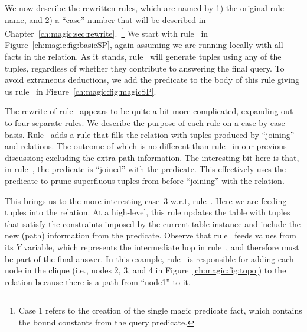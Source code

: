 We now describe the rewritten rules, which are named by 1) the original rule
name, and 2) a ``case'' number that will be described in
Chapter~\ref{ch:magic:sec:rewrite}.~\footnote{Case 1 refers to the creation of
the single magic predicate  fact, which contains the bound
constants from the query predicate.} We start with rule~ in
Figure~\ref{ch:magic:fig:basicSP}, again assuming we are running locally with
all facts in the  relation.  As it stands, rule~ will generate
 tuples using any of the  tuples, regardless of whether they
contribute to answering the final query.  To avoid extraneous deductions, we
add the  predicate to the body of this rule giving us
rule~ in Figure~\ref{ch:magic:fig:magicSP}.

The rewrite of rule~ appears to be quite a bit more complicated,
expanding out to four separate rules.  We describe the purpose of each rule on
a case-by-case basis.  Rule~ adds a rule that fills the
 relation with tuples produced by ``joining'' 
and  relations.  The outcome of which is no different than
rule~ in our previous discussion; excluding the extra path
information.  The interesting bit here is that, in rule~, the
 predicate is ``joined'' with the  predicate.  This
effectively uses the  predicate to prune superfluous tuples
from  before ``joining'' with the  relation.

This brings us to the more interesting case~$3$ w.r.t, rule~.  Here we
are feeding  tuples into the  relation.  At a
high-level, this rule updates the  table with tuples that
satisfy the constraints imposed by the current  table instance
and include the new (path) information from the  predicate.  Observe
that rule~ feeds  values from its $Y$ variable,
which represents the intermediate hop in rule~, and therefore must be
part of the final answer.  In this example, rule~ is responsible
for adding each node in the clique (i.e., nodes 2, 3, and 4 in
Figure~\ref{ch:magic:fig:topo}) to the  relation because there
is a path from ``node1'' to it.

